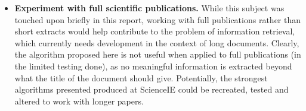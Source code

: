\begin{itemize}
	\item \textbf{Experiment with full scientific publications.} While this subject was touched upon briefly in this report, working with full publications rather than short extracts would help contribute to the problem of information retrieval, which currently needs development in the context of long documents. Clearly, the algorithm proposed here is not useful when applied to full publications (in the limited testing done), as no meaningful information is extracted beyond what the title of the document should give. Potentially, the strongest algorithms presented produced at ScienceIE could be recreated, tested and altered to work with longer papers.
\end{itemize}
